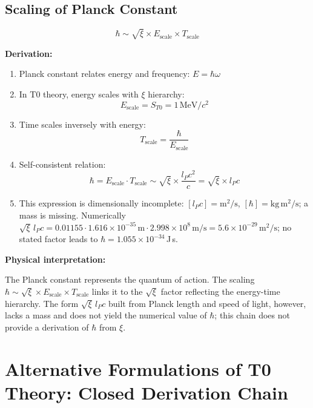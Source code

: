 	\subsection{Scaling of Planck Constant}
	
	\begin{keyresult}
		\[
		\hbar \sim \sqrt{\xi} \times E_{\text{scale}} \times T_{\text{scale}}
		\]
	\end{keyresult}
	
	\textbf{Derivation:}
	
	\begin{enumerate}
		\item Planck constant relates energy and frequency: $E = \hbar \omega$
		
		\item In T0 theory, energy scales with $\xi$ hierarchy:
		\[
		E_{\text{scale}} = S_{T0} = 1\,\text{MeV}/c^2
		\]
		
		\item Time scales inversely with energy:
		\[
		T_{\text{scale}} = \frac{\hbar}{E_{\text{scale}}}
		\]
		
		\item Self-consistent relation:
		\[
		\hbar = E_{\text{scale}} \cdot T_{\text{scale}} \sim \sqrt{\xi} \times \frac{l_P c^2}{c} = \sqrt{\xi} \times l_P c
		\]
		
		\item This expression is dimensionally incomplete: $[l_P c] = \text{m}^2/\text{s}$, $[\hbar] = \text{kg}\,\text{m}^2/\text{s}$; a mass is missing. Numerically $\sqrt{\xi}\, l_P c = 0.01155 \cdot 1.616 \times 10^{-35}\,\text{m} \cdot 2.998 \times 10^{8}\,\text{m/s} = 5.6 \times 10^{-29}\,\text{m}^2/\text{s}$; no stated factor leads to $\hbar = 1.055 \times 10^{-34}$\,J\,s.
	\end{enumerate}
	
	\textbf{Physical interpretation:}
	
	The Planck constant represents the quantum of action. The scaling $\hbar \sim \sqrt{\xi} \times E_{\text{scale}} \times T_{\text{scale}}$ links it to the $\sqrt{\xi}$ factor reflecting the energy-time hierarchy. The form $\sqrt{\xi}\, l_P c$ built from Planck length and speed of light, however, lacks a mass and does not yield the numerical value of $\hbar$; this chain does not provide a derivation of $\hbar$ from $\xi$.
	
	\section{Alternative Formulations of T0 Theory: Closed Derivation Chain}\label{sec:alternative_formulations}
	
